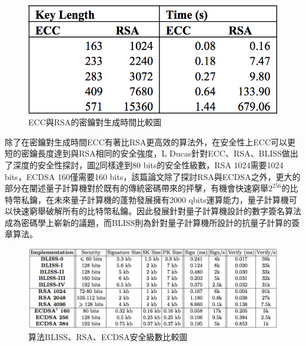 			\begin{figure}[htbp]
				\centering
				\includegraphics[width = .5\textwidth]{ECCtime.png}
				\caption{ECC與RSA的密鑰對生成時間比較圖\supercite{Performancecomparisonofellipticcurveandrsadigitalsignatures}}\label{ECCtime}
			\end{figure}

			除了在密鑰對生成時間ECC有著比RSA更高效的算法外，在安全性上ECC可以更短的密鑰長度達到與RSA相同的安全強度，L Ducas針對ECC、RSA、BLISS\supercite{LatticesignaturesandbimodalGaussians}做出了深度的安全性探討\supercite{LatticesignaturesandbimodalGaussians}，圖\ref{LatticesignaturesandbimodalGaussians}同樣達到80 bits的安全性級數，RSA 1024需要1024 bits，ECDSA 160\supercite{DeploymentsofEllipticCurveCryptography}僅需要160 bits，該篇論文除了探討RSA與ECDSA之外，更大的部分在闡述量子計算機對於既有的傳統密碼帶來的抨擊，有機會快速窮舉$2^{256}$的比特幣私鑰，在未來量子計算機的蓬勃發展擁有2000 qbits運算能力，量子計算機可以快速窮舉破解所有的比特幣私鑰。因此發展針對量子計算機設計的數字簽名算法成為密碼學上嶄新的議題，而BLISS則為針對量子計算機所設計的抗量子計算的簽章算法。

			\begin{figure}[htbp]
				\centering
				\includegraphics[width = 1\textwidth]{LatticesignaturesandbimodalGaussians.png}
				\caption{算法BLISS、RSA、ECDSA安全級數比較圖\supercite{LatticesignaturesandbimodalGaussians}}\label{LatticesignaturesandbimodalGaussians}
			\end{figure}

%
